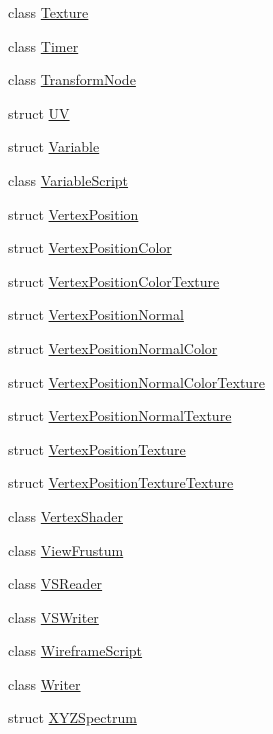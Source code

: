 \begin{DoxyCompactItemize}
class \hyperlink{classmage_1_1_texture}{Texture}
\item 
class \hyperlink{classmage_1_1_timer}{Timer}
\item 
class \hyperlink{classmage_1_1_transform_node}{Transform\+Node}
\item 
struct \hyperlink{structmage_1_1_u_v}{UV}
\item 
struct \hyperlink{structmage_1_1_variable}{Variable}
\item 
class \hyperlink{classmage_1_1_variable_script}{Variable\+Script}
\item 
struct \hyperlink{structmage_1_1_vertex_position}{Vertex\+Position}
\item 
struct \hyperlink{structmage_1_1_vertex_position_color}{Vertex\+Position\+Color}
\item 
struct \hyperlink{structmage_1_1_vertex_position_color_texture}{Vertex\+Position\+Color\+Texture}
\item 
struct \hyperlink{structmage_1_1_vertex_position_normal}{Vertex\+Position\+Normal}
\item 
struct \hyperlink{structmage_1_1_vertex_position_normal_color}{Vertex\+Position\+Normal\+Color}
\item 
struct \hyperlink{structmage_1_1_vertex_position_normal_color_texture}{Vertex\+Position\+Normal\+Color\+Texture}
\item 
struct \hyperlink{structmage_1_1_vertex_position_normal_texture}{Vertex\+Position\+Normal\+Texture}
\item 
struct \hyperlink{structmage_1_1_vertex_position_texture}{Vertex\+Position\+Texture}
\item 
struct \hyperlink{structmage_1_1_vertex_position_texture_texture}{Vertex\+Position\+Texture\+Texture}
\item 
class \hyperlink{classmage_1_1_vertex_shader}{Vertex\+Shader}
\item 
class \hyperlink{classmage_1_1_view_frustum}{View\+Frustum}
\item 
class \hyperlink{classmage_1_1_v_s_reader}{V\+S\+Reader}
\item 
class \hyperlink{classmage_1_1_v_s_writer}{V\+S\+Writer}
\item 
class \hyperlink{classmage_1_1_wireframe_script}{Wireframe\+Script}
\item 
class \hyperlink{classmage_1_1_writer}{Writer}
\item 
struct \hyperlink{structmage_1_1_x_y_z_spectrum}{X\+Y\+Z\+Spectrum}
\end{DoxyCompactItemize}
